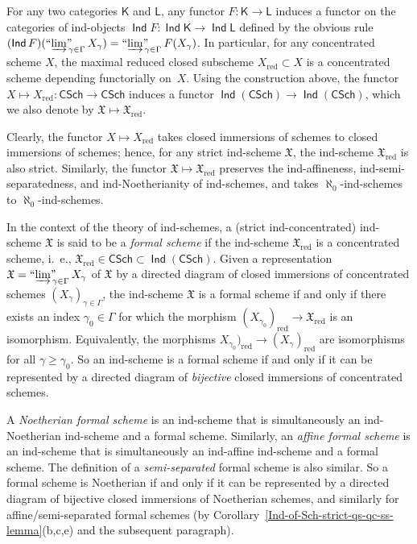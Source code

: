 \documentclass[12pt,a4paper]{amsart}
\newcommand{\+}{\protect\nobreakdash-}
\renewcommand{\:}{\colon}
\newcommand{\rarrow}{\longrightarrow}
\DeclareMathOperator{\Ind}{\mathsf{Ind}}
\newcommand{\CSch}{\mathsf{CSch}}
\newcommand{\red}{\mathrm{red}}
\newcommand{\ilim}
 {\mathop{\text{\normalfont``$\varinjlim$''\!\!}}\nolimits}
\newcommand{\sK}{\mathsf K}
\newcommand{\sL}{\mathsf L}
\newcommand{\fX}{\mathfrak X}
\theoremstyle{plain}
\theoremstyle{definition}
\begin{document}
 For any two categories $\sK$ and $\sL$, any functor
$F\:\sK\rarrow\sL$ induces a functor on the categories of ind-objects
$\Ind F\:\Ind\sK\rarrow\Ind\sL$ defined by the obvious rule
$(\Ind F)(\ilim_{\gamma\in\Gamma}X_\gamma)=
\ilim_{\gamma\in\Gamma}F(X_\gamma)$.
 In particular, for any concentrated scheme $X$, the maximal reduced
closed subscheme $X_\red\subset X$ is a concentrated scheme
depending functorially on~$X$.
 Using the construction above, the functor $X\longmapsto X_\red\:
\CSch\rarrow\CSch$ induces a functor $\Ind(\CSch)\rarrow\Ind(\CSch)$,
which we also denote by $\fX\longmapsto\fX_\red$.

 Clearly, the functor $X\longmapsto X_\red$ takes closed immersions
of schemes to closed immersions of schemes; hence, for any strict
ind-scheme $\fX$, the ind-scheme $\fX_\red$ is also strict.
 Similarly, the functor $\fX\longmapsto\fX_\red$ preserves
the ind-affineness, ind-semi-separatedness, and ind-Noetherianity
of ind-schemes, and takes $\aleph_0$\+ind-schemes to
$\aleph_0$\+ind-schemes.

 In the context of the theory of ind-schemes, a (strict
ind-concentrated) ind-scheme $\fX$ is said to be a \emph{formal
scheme} if the ind-scheme $\fX_\red$ is a concentrated scheme,
i.~e., $\fX_\red\in\CSch\subset\Ind(\CSch)$.
 Given a representation $\fX=\ilim_{\gamma\in\Gamma}X_\gamma$ of
$\fX$ by a directed diagram of closed immersions of concentrated
schemes $(X_\gamma)_{\gamma\in\Gamma}$, the ind-scheme $\fX$ is
a formal scheme if and only if there exists an index
$\gamma_0\in\Gamma$ for which the morphism $(X_{\gamma_0})_\red
\rarrow\fX_\red$ is an isomorphism.
 Equivalently, the morphisms $X_{\gamma_0})_\red\rarrow(X_\gamma)_\red$
are isomorphisms for all $\gamma\ge\gamma_0$.
 So an ind-scheme is a formal scheme if and only if it can be
represented by a directed diagram of \emph{bijective} closed
immersions of concentrated schemes.

 A \emph{Noetherian formal scheme} is an ind-scheme that is
simultaneously an ind-Noetherian ind-scheme and a formal scheme.
 Similarly, an \emph{affine formal scheme} is an ind-scheme that is
simultaneously an ind-affine ind-scheme and a formal scheme.
 The definition of a \emph{semi-separated} formal scheme is also
similar.
 So a formal scheme is Noetherian if and only if it can be represented
by a directed diagram of bijective closed immersions of Noetherian
schemes, and similarly for affine/semi-separated formal schemes
(by Corollary~\ref{Ind-of-Sch-strict-qs-qc-ss-lemma}(b,c,e) and
the subsequent paragraph).
\end{document}
